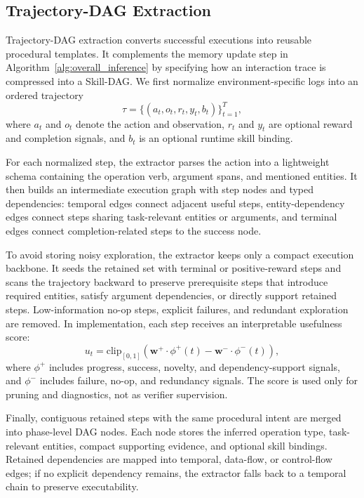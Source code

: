 \documentclass[letterpaper]{article}
\begin{document}
\subsection{Trajectory-DAG Extraction}
\label{app:trajectory_dag_extraction}

Trajectory-DAG extraction converts successful executions into reusable
procedural templates. It complements the memory update step in
Algorithm~\ref{alg:overall_inference} by specifying how an interaction trace is
compressed into a Skill-DAG. We first normalize environment-specific logs into
an ordered trajectory
\[
\tau=\{(a_t,o_t,r_t,y_t,b_t)\}_{t=1}^{T},
\]
where $a_t$ and $o_t$ denote the action and observation, $r_t$ and $y_t$ are
optional reward and completion signals, and $b_t$ is an optional runtime skill
binding.

For each normalized step, the extractor parses the action into a lightweight
schema containing the operation verb, argument spans, and mentioned entities.
It then builds an intermediate execution graph with step nodes and typed
dependencies: temporal edges connect adjacent useful steps, entity-dependency
edges connect steps sharing task-relevant entities or arguments, and terminal
edges connect completion-related steps to the success node.

To avoid storing noisy exploration, the extractor keeps only a compact execution
backbone. It seeds the retained set with terminal or positive-reward steps and
scans the trajectory backward to preserve prerequisite steps that introduce
required entities, satisfy argument dependencies, or directly support retained
steps. Low-information no-op steps, explicit failures, and redundant exploration
are removed. In implementation, each step receives an interpretable usefulness
score:
\[
u_t=\mathrm{clip}_{[0,1]}(\mathbf{w}^{+}\cdot\phi^{+}(t)
-\mathbf{w}^{-}\cdot\phi^{-}(t)),
\]
where $\phi^{+}$ includes progress, success, novelty, and dependency-support
signals, and $\phi^{-}$ includes failure, no-op, and redundancy signals. The
score is used only for pruning and diagnostics, not as verifier supervision.

Finally, contiguous retained steps with the same procedural intent are merged
into phase-level DAG nodes. Each node stores the inferred operation type,
task-relevant entities, compact supporting evidence, and optional skill
bindings. Retained dependencies are mapped into temporal, data-flow, or
control-flow edges; if no explicit dependency remains, the extractor falls back
to a temporal chain to preserve executability.
\end{document}
